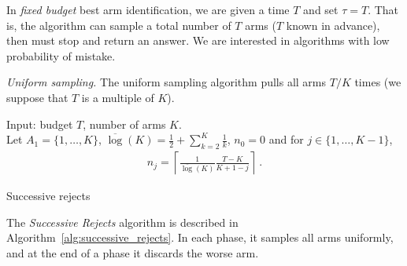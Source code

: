 In \emph{fixed budget} best arm identification, we are given a time $T$ and set $\tau = T$. That is, the algorithm can sample a total number of $T$ arms ($T$ known in advance), then must stop and return an answer. We are interested in algorithms with low probability of mistake.

\begin{questions}


\question \emph{Uniform sampling.} The uniform sampling algorithm pulls all arms $T/K$ times (we suppose that $T$ is a multiple of $K$).

\begin{algorithm}[!h]
    \SetAlgoLined
    Input: budget $T$, number of arms $K$.\\
    Let $A_1 = \{1, \ldots, K\}$, $\overline{\log}(K) = \frac{1}{2} + \sum_{k=2}^K \frac{1}{k}$, $n_0 = 0$ and for $j \in \{1, \ldots, K-1\}$,
    \begin{align*}
    n_j = \left\lceil \frac{1}{\overline{\log}(K)}\frac{T-K}{K+1-j}\right\rceil \: .
    \end{align*}
    \caption{Successive rejects}
    \label{alg:successive_rejects}
\end{algorithm}

\question The \emph{Successive Rejects} algorithm is described in Algorithm~\ref{alg:successive_rejects}. In each phase, it samples all arms uniformly, and at the end of a phase it discards the worse arm.
\end{questions}
